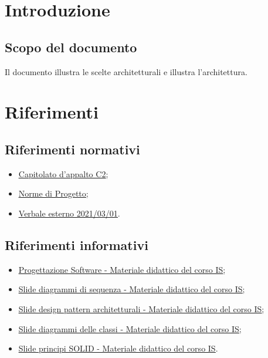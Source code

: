 \documentclass[a4paper, 12pt]{article}
\begin{document}
\makefrontpage

\makeversioni

\tableofcontents
\clearpage

\section{Introduzione}
\subsection{Scopo del documento}
Il documento illustra le scelte architetturali e illustra l'architettura.

\section{Riferimenti}
\subsection{Riferimenti normativi}
\begin{itemize}
    \item \underline{\href{https://www.math.unipd.it/~tullio/IS-1/2021/Progetto/C2.pdf}{Capitolato d'appalto C2}};
    \item \underline{\href{https://github.com/iota97/WinningSoftwareSolution/blob/main/public/interni/norme_di_progetto_v2.0.0.pdf}{Norme di Progetto}};
    \item \underline{\href{https://github.com/iota97/WinningSoftwareSolution/blob/main/public/esterni/verbali/2021_01_03_E.pdf}{Verbale esterno 2021/03/01}}.
\end{itemize}
\subsection{Riferimenti informativi}
\begin{itemize}
    \item \underline{\href{https://www.math.unipd.it/~tullio/IS-1/2021/Dispense/T09.pdf}{Progettazione Software - Materiale didattico del corso IS}};
    \item \underline{\href{https://www.math.unipd.it/~rcardin/swea/2022/Diagrammi\%20di\%20Sequenza.pdf}{Slide diagrammi di sequenza - Materiale didattico del corso IS}};
    \item \underline{\href{https://www.math.unipd.it/~rcardin/swea/2022/Software\%20Architecture\%20Patterns.pdf}{Slide design pattern architetturali - Materiale didattico del corso IS}};
    \item \underline{\href{https://www.math.unipd.it/~rcardin/swea/2021/Diagrammi\%20delle\%20Classi_4x4.pdf}{Slide diagrammi delle classi - Materiale didattico del corso IS}};
    \item \underline{\href{https://www.math.unipd.it/~rcardin/sweb/2022/L03.pdf}{Slide principi SOLID - Materiale didattico del corso IS}}.
\end{itemize}
\end{document}

